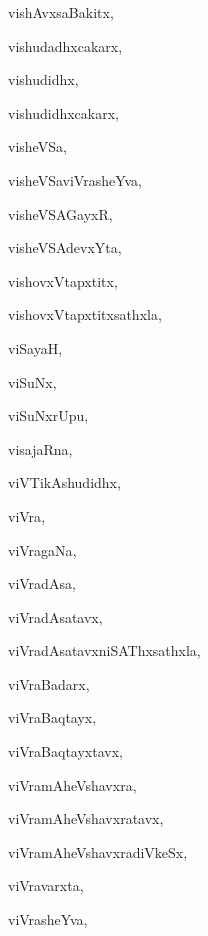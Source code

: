 \begin{multicols}{3}
{\noindent
{vishAvxsaBakitx}, \pageref{vishAvxsaBakitx}

\noindent
{vishudadhxcakarx}, \pageref{vishudadhxcakarx}

\noindent
{vishudidhx}, \pageref{vishudidhx}

\noindent
{vishudidhxcakarx}, \pageref{vishudidhxcakarx}

\noindent
{visheVSa}, \pageref{visheVSa}

\noindent
{visheVSaviVrasheYva}, \pageref{visheVSaviVrasheYva}

\noindent
{visheVSAGayxR}, \pageref{visheVSAGayxR}

\noindent
{visheVSAdevxYta}, \pageref{visheVSAdevxYta}

\noindent
{vishovxVtapxtitx}, \pageref{vishovxVtapxtitx}

\noindent
{vishovxVtapxtitxsathxla}, \pageref{vishovxVtapxtitxsathxla}

\noindent
{viSayaH}, \pageref{viSayaH}

\noindent
{viSuNx}, \pageref{viSuNx}

\noindent
{viSuNxrUpu}, \pageref{viSuNxrUpu}

\noindent
{visajaRna}, \pageref{visajaRna}

\noindent
{viVTikAshudidhx}, \pageref{viVTikAshudidhx}

\noindent
{viVra}, \pageref{viVra}

\noindent
{viVragaNa}, \pageref{viVragaNa}

\noindent
{viVradAsa}, \pageref{viVradAsa}

\noindent
{viVradAsatavx}, \pageref{viVradAsatavx}

\noindent
{viVradAsatavxniSAThxsathxla}, \pageref{viVradAsatavxniSAThxsathxla}

\noindent
{viVraBadarx}, \pageref{viVraBadarx}

\noindent
{viVraBaqtayx}, \pageref{viVraBaqtayx}

\noindent
{viVraBaqtayxtavx}, \pageref{viVraBaqtayxtavx}

\noindent
{viVramAheVshavxra}, \pageref{viVramAheVshavxra}

\noindent
{viVramAheVshavxratavx}, \pageref{viVramAheVshavxratavx}

\noindent
{viVramAheVshavxradiVkeSx}, \pageref{viVramAheVshavxradiVkeSx}

\noindent
{viVravarxta}, \pageref{viVravarxta}

\noindent
{viVrasheYva}, \pageref{viVrasheYva}

}
\end{multicols}
